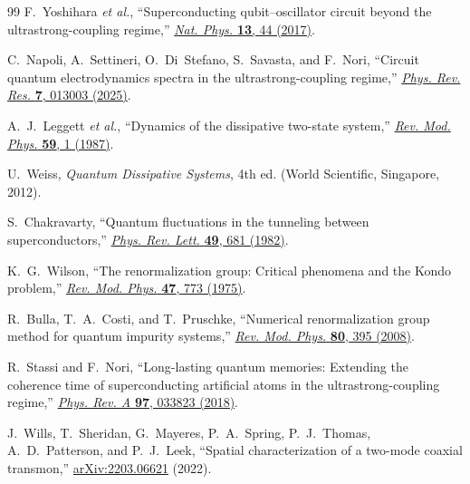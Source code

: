\documentclass[reprint, floatfix, superscriptaddress, amsmath, amssymb, longbibliography]{revtex4-2}
\begin{document}
\begin{thebibliography}{99}
F.~Yoshihara \textit{et al.},
``Superconducting qubit--oscillator circuit beyond the ultrastrong-coupling regime,''
\href{https://doi.org/10.1038/nphys3906}{\textit{Nat. Phys.} \textbf{13}, 44 (2017)}.

C.~Napoli, A.~Settineri, O.~Di~Stefano, S.~Savasta, and F.~Nori,
``Circuit quantum electrodynamics spectra in the ultrastrong-coupling regime,''
\href{https://doi.org/10.1103/PhysRevResearch.7.013003}{\textit{Phys. Rev. Res.} \textbf{7}, 013003 (2025)}.

A.~J.~Leggett \textit{et al.}, ``Dynamics of the dissipative two-state system,''
\href{https://doi.org/10.1103/RevModPhys.59.1}{\textit{Rev. Mod. Phys.} \textbf{59}, 1 (1987)}.

U.~Weiss,
\textit{Quantum Dissipative Systems}, 4th ed.
(World Scientific, Singapore, 2012).

S.~Chakravarty, ``Quantum fluctuations in the tunneling between superconductors,''
\href{https://doi.org/10.1103/PhysRevLett.49.681}{\textit{Phys. Rev. Lett.} \textbf{49}, 681 (1982)}.

K.~G.~Wilson, ``The renormalization group: Critical phenomena and the Kondo problem,''
\href{https://doi.org/10.1103/RevModPhys.47.773}{\textit{Rev. Mod. Phys.} \textbf{47}, 773 (1975)}.

R.~Bulla, T.~A.~Costi, and T.~Pruschke, ``Numerical renormalization group method for quantum impurity systems,''
\href{https://doi.org/10.1103/RevModPhys.80.395}{\textit{Rev. Mod. Phys.} \textbf{80}, 395 (2008)}.

R.~Stassi and F.~Nori, ``Long-lasting quantum memories: Extending the coherence time of superconducting artificial atoms in the ultrastrong-coupling regime,''
\href{https://doi.org/10.1103/PhysRevA.97.033823}{\textit{Phys. Rev. A} \textbf{97}, 033823 (2018)}.

J.~Wills, T.~Sheridan, G.~Mayeres, P.~A.~Spring, P.~J.~Thomas, A.~D.~Patterson, and P.~J.~Leek,
``Spatial characterization of a two-mode coaxial transmon,''
\href{https://arxiv.org/abs/2203.06621}{arXiv:2203.06621} (2022).



\end{thebibliography}
\end{document}
